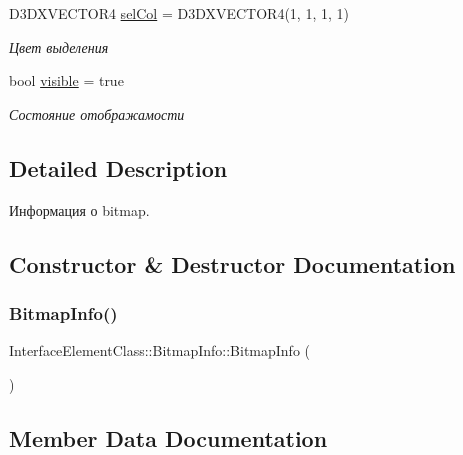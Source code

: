 \begin{DoxyCompactItemize}
D3\+D\+X\+V\+E\+C\+T\+O\+R4 \hyperlink{struct_interface_element_class_1_1_bitmap_info_a067ee4a5ea1c782be4f39e807e5b2ab0}{sel\+Col} = D3\+D\+X\+V\+E\+C\+T\+O\+R4(1, 1, 1, 1)
\begin{DoxyCompactList}\small\item\em Цвет выделения \end{DoxyCompactList}\item 
bool \hyperlink{struct_interface_element_class_1_1_bitmap_info_ace4be204345763b0127085aa402359b4}{visible} = true
\begin{DoxyCompactList}\small\item\em Состояние отображамости \end{DoxyCompactList}\end{DoxyCompactItemize}


\subsection{Detailed Description}
Информация о bitmap. 

\subsection{Constructor \& Destructor Documentation}
\mbox{\label{struct_interface_element_class_1_1_bitmap_info_a0369722a1aa1455eed9e139ee57e9ee1}} 
\subsubsection{\texorpdfstring{Bitmap\+Info()}{BitmapInfo()}}
{\footnotesize\ttfamily Interface\+Element\+Class\+::\+Bitmap\+Info\+::\+Bitmap\+Info (\begin{DoxyParamCaption}{ }\end{DoxyParamCaption})\hspace{0.3cm}{\ttfamily [inline]}}



\subsection{Member Data Documentation}
\mbox{\label{struct_interface_element_class_1_1_bitmap_info_abccd67845c92a9c8d3ee9c22e516f18a}} 
